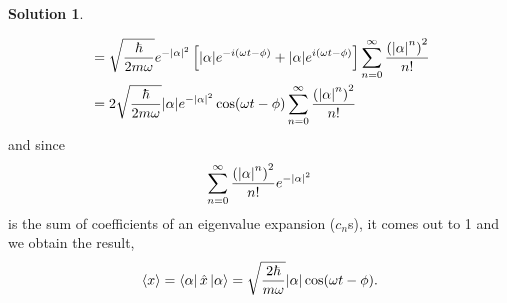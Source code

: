 \documentclass[10pt]{article}
\theoremstyle{definition}
\newtheorem{soln}{Solution}
\begin{document}
\begin{soln}
\begin{enumerate}[label=(\alph*)]
\begin{align*}
                                                       & =\sqrt{\frac{\hbar}{2m\omega}}e^{-\abs{\alpha}^2}\left[\abs{\alpha} e^{-i(\omega t-\phi)}+\abs{\alpha}e^{i(\omega t-\phi)}\right]\sum_{n=0}^\infty\frac{\left(\abs{\alpha}^{n}\right)^2}{n!}                                          \\
                                                       & =2\sqrt{\frac{\hbar}{2m\omega}}\abs{\alpha}e^{-\abs{\alpha}^2}\cos(\omega t-\phi)\sum_{n=0}^\infty\frac{\left(\abs{\alpha}^{n}\right)^2}{n!}
          \end{align*}
          and since $$\sum_{n=0}^\infty\frac{\left(\abs{\alpha}^{n}\right)^2}{n!}e^{-\abs{\alpha}^2}$$
          is the sum of coefficients of an eigenvalue expansion ($c_n$s), it comes out to 1 and we obtain the result,
          $$
            \expval{x}=\bra{\alpha}\hat{x}\ket{\alpha}  =\sqrt{\frac{2\hbar}{m\omega}}\abs{\alpha}\cos(\omega t-\phi).
          $$
  \end{enumerate}
\end{soln}
\end{document}
